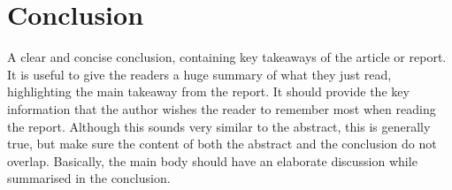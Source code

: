 \section{Conclusion}
A clear and concise conclusion, containing key takeaways of the article or report. It is useful to give the readers a huge summary of what they just read, highlighting the main takeaway from the report. It should provide the key information that the author wishes the reader to remember most when reading the report. Although this sounds very similar to the abstract, this is generally true, but make sure the content of both the abstract and the conclusion do not overlap. Basically, the main body should have an elaborate discussion while summarised in the conclusion. 
